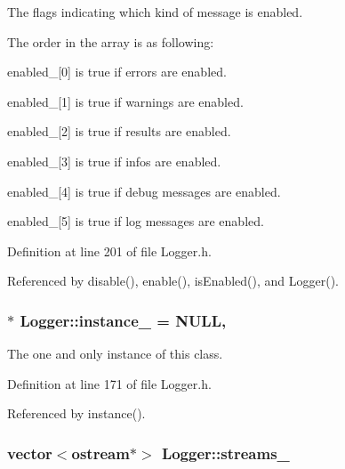 The flags indicating which kind of message is enabled. 

The order in the array is as following\-: 
\begin{DoxyItemize}
\item enabled\-\_\-\mbox{[}0\mbox{]} is true if errors are enabled. 
\item enabled\-\_\-\mbox{[}1\mbox{]} is true if warnings are enabled. 
\item enabled\-\_\-\mbox{[}2\mbox{]} is true if results are enabled. 
\item enabled\-\_\-\mbox{[}3\mbox{]} is true if infos are enabled. 
\item enabled\-\_\-\mbox{[}4\mbox{]} is true if debug messages are enabled. 
\item enabled\-\_\-\mbox{[}5\mbox{]} is true if log messages are enabled. 
\end{DoxyItemize}

Definition at line 201 of file Logger.\-h.



Referenced by disable(), enable(), is\-Enabled(), and Logger().

\hypertarget{classLogger_a4f56ea837ef338071364583d6368b7c8}{
\subsubsection[{instance\-\_\-}]{ $\ast$ Logger\-::instance\-\_\- = N\-U\-L\-L\hspace{0.3cm}{\ttfamily [static]}, {\ttfamily [protected]}}}\label{classLogger_a4f56ea837ef338071364583d6368b7c8}


The one and only instance of this class. 



Definition at line 171 of file Logger.\-h.



Referenced by instance().

\hypertarget{classLogger_a6e3fde7c57b8e2ba82876ad2972c375b}{
\subsubsection[{streams\-\_\-}]{\setlength{\rightskip}{0pt plus 5cm}vector$<$ostream$\ast$$>$ Logger\-::streams\-\_\-\hspace{0.3cm}{\ttfamily [protected]}}}\label{classLogger_a6e3fde7c57b8e2ba82876ad2972c375b}


